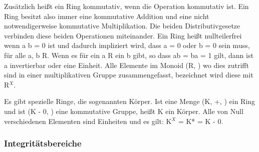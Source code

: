 			Zusätzlich heißt ein Ring kommutativ, wenn die Operation \mycdot kommutativ ist. Ein Ring besitzt also immer eine kommutative Addition und eine nicht notwendigerweise kommutative Multiplikation. Die beiden Distributivgesetze verbinden diese beiden Operationen miteinander. Ein Ring heißt nullteilerfrei wenn a \mycdot b = 0 ist und dadurch impliziert wird, dass a = 0 oder b = 0 sein muss, für alle a, b \myin R. Wenn es für ein a \myin R ein b gibt, so dass ab = ba = 1 gilt, dann ist a invertierbar oder eine Einheit. Alle Elemente im Monoid (R, \mycdotOhne) wo dies zutrifft sind in einer multiplikativen Gruppe zusammengefasst, bezeichnet wird diese mit R$^X$.~\cite{Erste:Hilfe:in:Linearer:Algebra}
			
			Es gibt spezielle Ringe, die sogenannten Körper. Ist eine Menge (K, +, \mycdotOhne) ein Ring und ist (K - {0}, \mycdotOhne) eine kommutative Gruppe, heißt K ein Körper. Alle von Null verschiedenen Elementen sind Einheiten und es gilt: K$^X$ = K* = K - {0}.~\cite{Erste:Hilfe:in:Linearer:Algebra}
			
		\subsubsection{Integritätsbereiche}
			